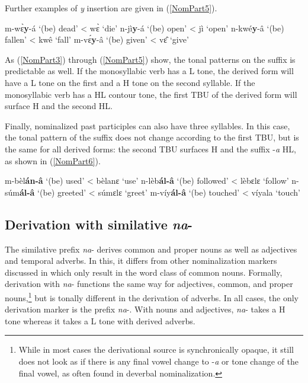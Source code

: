 \noindent Further examples of {\itshape y} insertion are given in (\ref{NomPart5}).

\begin{exe}
\ex\label{NomPart5} 
\begin{xlist}
\ex m-wɛ̀{\bfseries y}-á `(be) dead' < wɛ̀ `die'
\ex n-jì{\bfseries y}-á `(be) open' < jì `open'
\ex n-kwé{\bfseries y}-â `(be) fallen' < kwê `fall'
\ex m-vɛ́{\bfseries y}-â `(be) given' < vɛ̂ `give'
\end{xlist}
\end{exe}

As (\ref{NomPart3}) through (\ref{NomPart5}) show, the tonal patterns on the suffix is predictable as well. If the monosyllabic verb has a L tone, the derived form will have a L tone on the first and a H tone on the second syllable. If the monosyllabic verb has a HL contour tone, the first TBU of the derived form will surface H and the second HL. 

Finally, nominalized past participles can also have three syllables. In this case,  the tonal pattern of the suffix does not change according to the first TBU, but is the same for all derived forms: the second TBU surfaces H and the suffix -{\itshape a} HL, as shown in (\ref{NomPart6}).

\begin{exe}
\ex\label{NomPart6} 
\begin{xlist}
\ex m-bèl{\bfseries án-â} `(be) used' < bèlanɛ `use'
\ex n-lèb{\bfseries ál-â} `(be) followed' < lèbɛlɛ `follow'
\ex n-súm{\bfseries ál-â} `(be) greeted' < súmɛlɛ `greet'
\ex m-víy{\bfseries ál-â} `(be) touched' < víyala `touch'
\end{xlist}
\end{exe}




\subsection{Derivation with similative {\itshape na}-}
\label{sec:NOMSIM}

The similative prefix {\itshape na}- derives common and proper nouns as well as adjectives and temporal adverbs. In this, it differs from other nominalization markers discussed in  which only result in the word class of common nouns. Formally, derivation with {\itshape na}- functions the same way for adjectives, common, and proper nouns,\footnote{While in most cases the derivational source is synchronically opaque, it still does not look as if there is any final vowel change to -{\itshape a} or tone change of the final vowel, as often found in deverbal nominalization.} but is tonally different in the derivation of adverbs. In all cases, the only derivation marker is the prefix {\itshape na}-. With nouns and adjectives, {\itshape na}- takes a H tone whereas it takes a L tone with derived adverbs.

